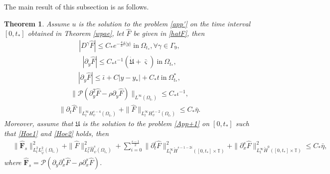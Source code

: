 \documentclass{amsart}
\numberwithin{equation}{section}
\newtheorem{theorem}{Theorem}[section]
\newcommand\y{{{\langle y \rangle}}}
\begin{document}
The main result of this subsection is as follows.
\begin{theorem}
Assume $u$ is the solution to the problem \eqref{app'} on the time interval $[0,t_{*}]$ obtained in Theorem \ref{wpae}, let $\hat{F}$ be given in \eqref{hatF}, then
\begin{align}\label{Fe1}
|D^{\gamma}\hat{F}|\leq C_{*}e^{-\frac{4}{3}\delta\y}~\text{in}~\Omega_{t_{*}}, \forall \gamma\in\Gamma_{9},
\end{align}
\begin{align}\label{Fe2}
|\partial_{y}\hat{F}|\leq C_{*}\iota^{-1}(\dot{\mathfrak{U}}+\bar{\varsigma})~\text{in}~\Omega_{t_{*}},
\end{align}
\begin{align}\label{Fe3}
|\partial_{y}\hat{F}|\leq \bar{\iota}+C|y-y_{*}|+C_{*}t~\text{in}~\Omega_{t_{*}}^{*},
\end{align}
\begin{align}\label{Fe4}
\|\mathcal{P}(\partial_{y}^{2}\hat{F}-\rho\partial_{y}\hat{F})\|_{L^{\infty}(\Omega_{t_{*}})}\leq C_{*}\iota^{-1},
\end{align}
\begin{align}\label{Fe5}
\|\partial_{t}\hat{F}\|_{L_{t}^{\infty}H_{\psi}^{s-4}(\Omega_{t_{*}})}
+\|\hat{F}\|_{L_{t}^{\infty}H_{\psi}^{s-2}(\Omega_{t_{*}})}
\leq C_{*}\bar{\eta}.
\end{align}
Moreover, assume that $\mathfrak{U}$ is the solution to the problem \eqref{App+1} on $[0,t_{*}]$ such that \eqref{Hoe1} and \eqref{Hoe2} holds, then
\begin{align}\label{Fe6}
& \|\hat{\mathbf{F}}_{s}\|_{L_{t}^{2}L_{\hat{\psi}}^{2}(\Omega_{t_{*}})}^{2}
 +\|\hat{F}\|_{L_{t}^{2}\hat{H}_{\psi}^{s}(\Omega_{t_{*}})}^{2}
 +\sum_{i=0}^{\frac{s-1}{2}}\|\partial_{t}^{i}\hat{F}\|_{L_{t}^{\infty}\mathring{H}^{s-1-2i}([0,t_{*}]\times\mathbb{T})}^{2}
 +\|\partial_{x}^{s}\hat{F}\|_{L_{t}^{\infty}\mathring{H}^{0}([0,t_{*}]\times\mathbb{T})}^{2}
\leq C_{*}\bar{\eta},
\end{align}
where $\hat{\mathbf{F}}_{s}=\mathcal{P}\left(\partial_{y}\partial_{x}^{s}\hat{F}-\rho\partial_{x}^{s}\hat{F}\right)$.
\end{theorem}
\end{document}
